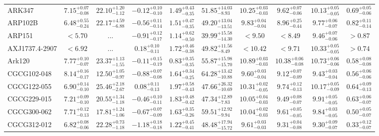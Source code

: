 \documentclass[onecolumn]{mn2e}
\begin{document}
\begin{landscape}
{\begin{center}
\begin{longtable}{lccccccccc}
ARK347 & $7.15_{-0.08}^{+0.07}$ & $22.10_{-1.12}^{+1.20}$ & $-0.12_{-0.10}^{+0.10}$ & $1.49_{-0.35}^{+0.43}$ &$51.85_{-8.93}^{+14.03}$ & $10.25_{-0.03}^{+0.03}$ & $9.62_{-0.06}^{+0.07}$ & $10.13_{-0.05}^{+0.05}$ & $0.69_{-0.06}^{+0.05}$ \\
ARP102B & $6.48_{-0.24}^{+0.55}$ & $22.17_{-6.88}^{+4.59}$ & $-0.56_{-0.14}^{+0.11}$ & $1.51_{-0.35}^{+0.47}$ &$49.20_{-13.51}^{+13.04}$ & $9.83_{-0.04}^{+0.04}$ & $8.96_{-0.44}^{+0.25}$ & $9.77_{-0.07}^{+0.06}$ & $0.82_{-0.14}^{+0.11}$ \\
ARP151 & $<5.70$ & ... & $-0.91_{-0.17}^{+0.12}$ & $1.14_{-0.50}^{+0.62}$ &$39.99_{-14.30}^{+15.58}$ & $<9.50$ & $<8.49$ & $9.46_{-0.06}^{+0.07}$ & $>0.87$ \\
AXJ1737.4-2907 & $<6.92$ & ... & $0.18_{-0.11}^{+0.10}$ & $1.72_{-0.38}^{+0.46}$ &$49.82_{-8.49}^{+11.56}$ & $<10.42$ & $<9.71$ & $10.33_{-0.05}^{+0.05}$ & $>0.74$ \\
Ark120 & $7.77_{-0.07}^{+0.10}$ & $23.37_{-1.55}^{+1.13}$ & $-0.11_{-0.19}^{+0.15}$ & $0.83_{-0.35}^{+0.35}$ &$55.87_{-15.70}^{+15.98}$ & $10.89_{-0.03}^{+0.03}$ & $10.38_{-0.08}^{+0.06}$ & $10.73_{-0.06}^{+0.06}$ & $0.58_{-0.08}^{+0.08}$ \\
CGCG102-048 & $8.14_{-0.17}^{+0.16}$ & $12.50_{-0.97}^{+1.05}$ & $-0.88_{-0.08}^{+0.07}$ & $1.64_{-0.25}^{+0.34}$ &$64.28_{-10.88}^{+13.42}$ & $9.60_{-0.04}^{+0.03}$ & $9.12_{-0.09}^{+0.07}$ & $9.43_{-0.04}^{+0.03}$ & $0.56_{-0.06}^{+0.06}$ \\
CGCG122-055 & $6.90_{-0.10}^{+0.14}$ & $25.46_{-2.67}^{+2.18}$ & $0.08_{-0.13}^{+0.11}$ & $1.97_{-0.43}^{+0.58}$ &$47.66_{-10.69}^{+26.32}$ & $10.31_{-0.05}^{+0.02}$ & $9.74_{-0.13}^{+0.12}$ & $10.17_{-0.09}^{+0.05}$ & $0.64_{-0.13}^{+0.09}$ \\
CGCG229-015 & $7.21_{-0.10}^{+0.09}$ & $20.55_{-1.18}^{+1.34}$ & $-0.46_{-0.11}^{+0.10}$ & $1.83_{-0.42}^{+0.48}$ &$47.34_{-7.83}^{+12.89}$ & $10.05_{-0.03}^{+0.04}$ & $9.49_{-0.07}^{+0.08}$ & $9.91_{-0.05}^{+0.05}$ & $0.63_{-0.07}^{+0.06}$ \\
CGCG300-062 & $7.71_{-0.13}^{+0.12}$ & $17.81_{-1.06}^{+1.24}$ & $-0.67_{-0.09}^{+0.07}$ & $1.63_{-0.26}^{+0.35}$ &$59.51_{-9.94}^{+12.92}$ & $10.04_{-0.03}^{+0.02}$ & $9.61_{-0.05}^{+0.05}$ & $9.84_{-0.05}^{+0.03}$ & $0.50_{-0.07}^{+0.05}$ \\
CGCG312-012 & $6.82_{-0.06}^{+0.08}$ & $22.28_{-1.18}^{+0.73}$ & $-1.18_{-0.18}^{+0.18}$ & $1.22_{-0.41}^{+0.45}$ &$48.48_{-15.72}^{+17.94}$ & $9.61_{-0.03}^{+0.03}$ & $9.31_{-0.08}^{+0.04}$ & $9.30_{-0.07}^{+0.09}$ & $0.33_{-0.07}^{+0.12}$ \\

\end{longtable}
\end{center}}
\end{landscape}
\end{document}
